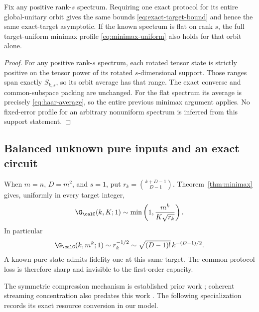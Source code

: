 \begin{corollary}\label{cor:known-spectrum}
Fix any positive rank-$s$ spectrum. Requiring one exact protocol for its entire global-unitary orbit gives the same bounds \eqref{eq:exact-target-bound} and hence the same exact-target asymptotic. If the known spectrum is flat on rank $s$, the full target-uniform minimax profile \eqref{eq:minimax-uniform} also holds for that orbit alone.
\end{corollary}
\begin{proof}
For any positive rank-$s$ spectrum, each rotated tensor state is strictly positive on the tensor power of its rotated $s$-dimensional support. Those ranges span exactly $S_{k,s}$, so its orbit average has that range. The exact converse and common-subspace packing are unchanged. For the flat spectrum its average is precisely \eqref{eq:haar-average}, so the entire previous minimax argument applies. No fixed-error profile for an arbitrary nonuniform spectrum is inferred from this support statement.
\end{proof}

\subsection{Balanced unknown pure inputs and an exact circuit}
When $m=n$, $D=m^2$, and $s=1$, put $r_k=\binom{k+D-1}{D-1}$. Theorem~\ref{thm:minimax} gives, uniformly in every target integer,
\[
 \G_{\calC}(k,K;1)\sim\min\left(1,\frac{m^k}{K\sqrt{r_k}}\right).
\]
In particular
\begin{equation}\label{eq:pure-full-output}
 \G_{\calC}(k,m^k;1)\sim r_k^{-1/2}
 \sim\sqrt{(D-1)!}\,k^{-(D-1)/2}.
\end{equation}
A known pure state admits fidelity one at this same target. The common-protocol loss is therefore sharp and invisible to the first-order capacity.

The symmetric compression mechanism is established prior work \cite{plesch,baertschi,chen}; coherent streaming concentration also predates this work \cite{streaming}. The following specialization records its exact resource conversion in our model.

